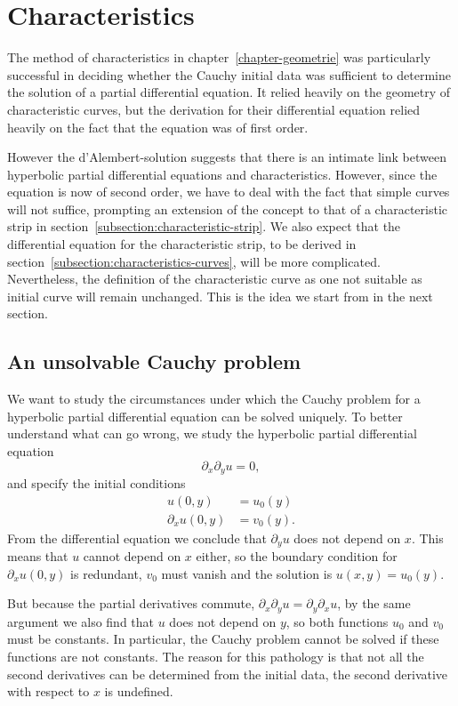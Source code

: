 %
%
%
\section{Characteristics}
The method of characteristics in chapter~\ref{chapter-geometrie} 
was particularly successful in deciding whether the Cauchy initial
data was sufficient to determine the solution of a partial differential
equation.
It relied heavily on the geometry of characteristic curves, but the
derivation for their differential equation relied heavily on the fact
that the equation was of first order.

However the d'Alembert-solution suggests that there is an intimate
link between hyperbolic partial differential equations and characteristics.
However, since the equation is now of second order, we have to deal
with the fact that simple curves will not suffice, prompting an extension
of the concept to that of a characteristic strip in
section~\ref{subsection:characteristic-strip}.
We also expect that the differential equation for the characteristic
strip, to be derived in section~\ref{subsection:characteristics-curves},
will be more complicated.
Nevertheless, the definition of the characteristic curve as one not
suitable as initial curve will remain unchanged.
This is the idea we start from in the next section.

\subsection{An unsolvable Cauchy problem}
We want to study the circumstances under which the Cauchy problem
for a hyperbolic partial differential equation can be solved
uniquely.
To better understand what can go wrong, we study the hyperbolic
partial differential equation
\[
\partial_x\partial_y u=0,
\]
and specify the initial conditions
\begin{align*}
u(0,y)&=u_0(y)
\\
\partial_xu(0,y)&=v_0(y).
\end{align*}
From the differential equation we conclude that $\partial_y u$
does not depend on $x$.
This means that $u$ cannot depend on $x$ either, so the boundary
condition for $\partial_xu(0,y)$ is redundant, $v_0$ must vanish
and the solution is $u(x,y)=u_0(y)$.

But because the partial derivatives commute,
$\partial_x\partial_yu=\partial_y\partial_xu$, by the same
argument we also find that $u$ does not depend on $y$, so both functions
$u_0$ and $v_0$ must be constants.
In particular, the Cauchy problem cannot be solved if these
functions are not constants.
The reason for this pathology is that not all the second derivatives can be
determined from the initial data, the second derivative with respect
to $x$ is undefined.


